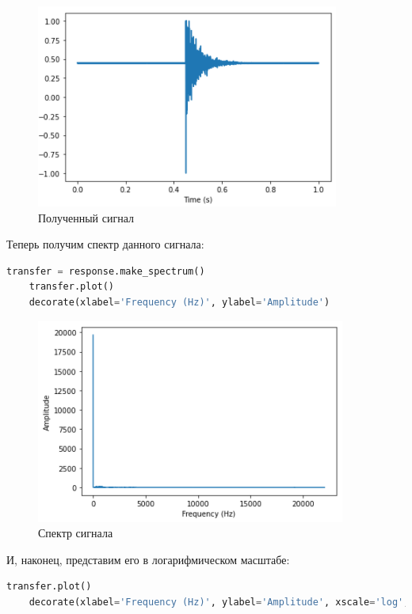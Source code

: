 \documentclass[a4paper]{article}
\begin{document}
            \begin{figure}[H]
                \centering
                \includegraphics{ex_2_1.png}
                \caption{Полученный сигнал}
                \label{fig:ex_2_1}
            \end{figure}
            
            Теперь получим спектр данного сигнала:
            
\begin{lstlisting}[language=Python, caption= Получение спектра сигнала]
    transfer = response.make_spectrum()
    transfer.plot()
    decorate(xlabel='Frequency (Hz)', ylabel='Amplitude')
\end{lstlisting}
            
            \begin{figure}[H]
                \centering
                \includegraphics{ex_2_2.png}
                \caption{Спектр сигнала}
                \label{fig:ex_2_2}
            \end{figure}
            
            И, наконец, представим его в логарифмическом масштабе:
            
\begin{lstlisting}[language=Python, caption= Получение спектра сигнала в логарифмическом масштабе]
    transfer.plot()
    decorate(xlabel='Frequency (Hz)', ylabel='Amplitude', xscale='log', yscale='log')
\end{lstlisting}
            
\end{document}
